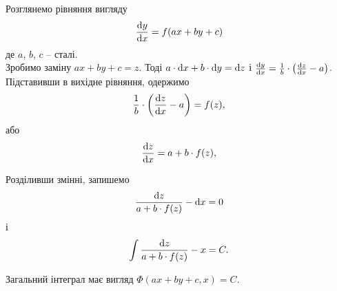 Розглянемо рівняння вигляду
\begin{equation}
	\label{eq:1.8}
	\frac{\mathop{}\!\mathrm{d} y}{\mathop{}\!\mathrm{d} x} = f(a x + b y + c)
\end{equation}
де $a$, $b$, $c$ -- сталі. \\

Зробимо заміну $a x + b y + c = z$. Тоді $a \cdot \mathop{}\!\mathrm{d} x + b \cdot \mathop{}\!\mathrm{d} y = \mathop{}\!\mathrm{d} z$ і $\frac{\mathop{}\!\mathrm{d} y}{\mathop{}\!\mathrm{d} x} = \frac1b \cdot \left( \frac{\mathop{}\!\mathrm{d} z}{\mathop{}\!\mathrm{d} x} - a \right)$. \\

Підставивши в вихідне рівняння, одержимо
\begin{equation}
	\label{eq:1.9}
	\frac1b \cdot \left( \frac{\mathop{}\!\mathrm{d} z}{\mathop{}\!\mathrm{d} x} - a \right) = f(z),
\end{equation}
або
\begin{equation}
	\label{eq:1.10}
	\frac{\mathop{}\!\mathrm{d} z}{\mathop{}\!\mathrm{d} x} = a + b \cdot f (z),
\end{equation}

Розділивши змінні, запишемо
\begin{equation}
	\label{eq:1.11}
	\frac{\mathop{}\!\mathrm{d} z}{a + b \cdot f (z)} - \mathop{}\!\mathrm{d} x = 0
\end{equation}
і
\begin{equation}
	\label{eq:1.12}
	\int \frac{\mathop{}\!\mathrm{d} z}{a + b \cdot f (z)} - x = C.
\end{equation}

Загальний інтеграл має вигляд $\Phi(a x + b y + c, x) = C$.